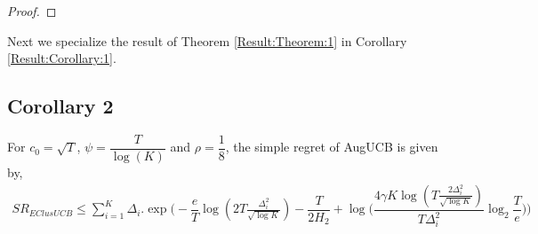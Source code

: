 \begin{proof}
%
%
%
%
%
%
%
%
%
%

\end{proof}

	Next we specialize the result of Theorem \ref{Result:Theorem:1} in Corollary \ref{Result:Corollary:1}.

\subsection{Corollary 2}


\begin{corollary}
\label{Result:Corollary:1}
For $c_{0}=\sqrt{T}$, $\psi=\dfrac{T}{\log (K)}$ and $\rho=\dfrac{1}{8}$, the simple regret of AugUCB is given by,
\begin{align*}
SR_{EClusUCB} \leq  \sum_{i=1}^{K} \Delta_{i}.\exp\bigg(-\dfrac{e}{T}\log ( 2T\frac{\Delta_{i}^{2}}{\sqrt{\log K}})-\dfrac{T}{2 H_{2}} + \log \big( \dfrac{4\gamma K\log ( T \frac{2\Delta_{i}^{2}}{\sqrt{\log K}})}{T\Delta_{i}^{2}}\log_{2}\dfrac{T}{e} \big) \bigg)
\end{align*}
\end{corollary}

